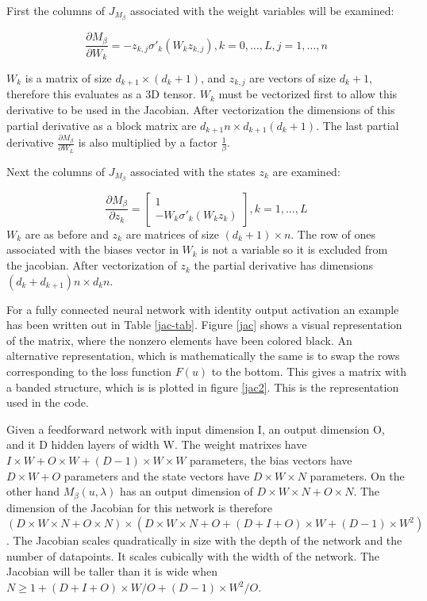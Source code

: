  First the columns of $J_{M_{\beta}}$ associated with the weight variables will be examined:
 
\begin{equation}
	\frac{\partial{M_{\beta}}}{\partial W_k} = -z_{k,j}\sigma'_k(W_kz_{k,j}), k = 0,\ldots,L, j = 1,\ldots,n
\end{equation}

$W_k$ is a matrix of size $d_{k+1}\times(d_k+1)$, and $z_{k,j}$ are vectors of size $d_k+1$, therefore this evaluates as a 3D tensor. $W_k$ must be vectorized first to allow this derivative to be used in the Jacobian. After vectorization the dimensions of this partial derivative as a block matrix are $d_{k+1}n \times d_{k+1}(d_{k}+1)$. The last partial derivative $\frac{\partial{M_{\beta}}}{\partial W_L}$ is also multiplied by a factor $\frac{1}{\beta}$.

 Next the columns of $J_{M_{\beta}}$ associated with the states $z_k$ are examined:
 
 \begin{equation}
 	\frac{\partial{M_{\beta}}}{\partial z_k} = \begin{bmatrix} 1 \\ -W_k\sigma'_k(W_kz_k) \end{bmatrix}, k = 1,\ldots,L
 \end{equation}
 $W_k$ are as before and $z_k$ are matrices of size $(d_k+1)\times n$. The row of ones associated with the biases vector in $W_k$ is not a variable so it is excluded from the jacobian. After vectorization of $z_k$ the partial derivative has dimensions $(d_k+d_{k+1})n\times d_kn$.
 
For a fully connected neural network with identity output activation an example has been written out in Table \ref{jac-tab}. Figure \ref{jac} shows a visual representation of the matrix, where the nonzero elements have been colored black. An alternative representation, which is mathematically the same is to swap the rows corresponding to the loss function $F(u)$ to the bottom. This gives a matrix with a banded structure, which is is plotted in figure \ref{jac2}. This is the representation used in the code.


Given a feedforward network with input dimension I, an output dimension O, and it D hidden layers of width W. The weight matrixes have $I\times W + O\times W + (D-1)\times W\times W$ parameters, the bias vectors have $D\times W+O$ parameters and the state vectors have $D\times W\times N$ parameters. On the other hand $M_{\beta}(u,\lambda)$ has an output dimension of $D\times W \times N + O\times N$. The dimension of the Jacobian for this network is therefore $(D \times W\times N + O\times N)\times (D\times W\times N + O + (D+I+O)\times W + (D-1)\times W^2)$. The Jacobian scales quadratically in size with the depth of the network and the number of datapoints. It scales cubically with the width of the network. The Jacobian will be taller than it is wide when $N \geq 1 + (D+I+O)\times W/O + (D-1)\times W^2/O$. 


